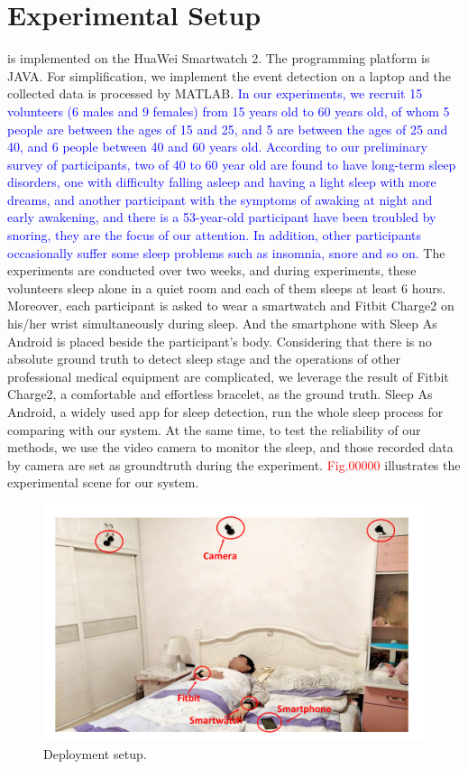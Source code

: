 \section{Experimental Setup}
{\systemname} is implemented on the HuaWei Smartwatch 2. The programming platform is JAVA. For simplification, we implement the event detection on a laptop and the collected data is processed by MATLAB. \textcolor{blue}{In our experiments, we recruit 15 volunteers (6 males and 9 females) from 15 years old to 60 years old,  of whom 5 people are between the ages of 15 and 25, and 5 are between the ages of 25 and 40, and 6 people between 40 and 60 years old. According to our preliminary survey of participants, two of 40 to 60 year old are found to have long-term sleep disorders,  one with difficulty falling asleep and having a light sleep with more dreams, and another participant with the symptoms of awaking at night and early awakening, and there is a 53-year-old participant have been troubled by snoring, they are the focus of our attention. In addition, other participants occasionally suffer some sleep problems such as insomnia, snore and so on.} The experiments are conducted over two weeks, and during experiments, these volunteers sleep alone in a quiet room and each of them sleeps at least 6 hours. Moreover, each participant is asked to wear a smartwatch and Fitbit Charge2 \cite{fitbit} on his/her wrist simultaneously during sleep. And the smartphone with Sleep As Android \cite{SleepAndroid} is placed beside the participant's body. Considering that there is no absolute ground truth to detect sleep stage and the operations of other professional medical equipment are complicated, we leverage the result of Fitbit Charge2, a comfortable and effortless bracelet, as the ground truth. Sleep As Android, a widely used app for sleep detection, run the whole sleep process for comparing with our system. At the same time, to test the reliability of our methods, we use the video camera to monitor the sleep, and those recorded data by camera are set as groundtruth during the experiment. \textcolor{red}{Fig.00000} illustrates the experimental scene for our system.

\begin{figure}[!thbp]
	\centering
	\includegraphics[width=0.52\linewidth]{Figures/setup.pdf}
	\caption{Deployment setup.}\label{fig:setup}
\end{figure}

